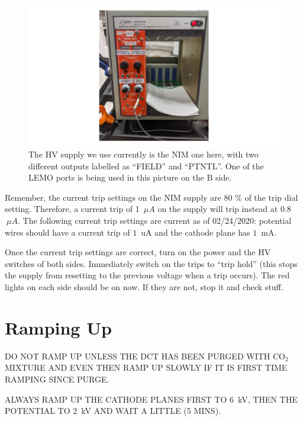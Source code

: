 \documentclass[12pt]{article}
\begin{document}
\begin{figure}
  \hspace{-1.4in}
  \includegraphics[scale=0.4]{dct_nim_Hv.png}
  \caption{The HV supply we use currently is the NIM one here, with two different outputs labelled as ``FIELD'' and ``PTNTL''. One of the LEMO ports is being used in this picture on the B side.}
  \label{fig:nim}
\end{figure}

Remember, the current trip settings on the NIM supply are 80 \% of the trip dial setting. Therefore, a current trip of 1~$\mu A$ on the supply will trip instead at 0.8$~\mu A$. The following current trip settings are current as of 02/24/2020: potential wires should have a current trip of $1$~uA and the cathode plane has $1$~mA. 

Once the current trip settings are correct, turn on the power and the HV switches of both sides. Immediately switch on the trips to ``trip hold'' (this stops the supply from resetting to the previous voltage when a trip occurs). The red lights on each side should be on now. If they are not, stop it and check stuff. 

\section{Ramping Up}
DO NOT RAMP UP UNLESS THE DCT HAS BEEN PURGED WITH CO$_{2}$ MIXTURE AND EVEN THEN RAMP UP SLOWLY IF IT IS FIRST TIME RAMPING SINCE PURGE.

ALWAYS RAMP UP THE CATHODE PLANES FIRST TO $6$~kV, THEN THE POTENTIAL TO $2$~kV AND WAIT A LITTLE (5 MINS). %
\end{document}
